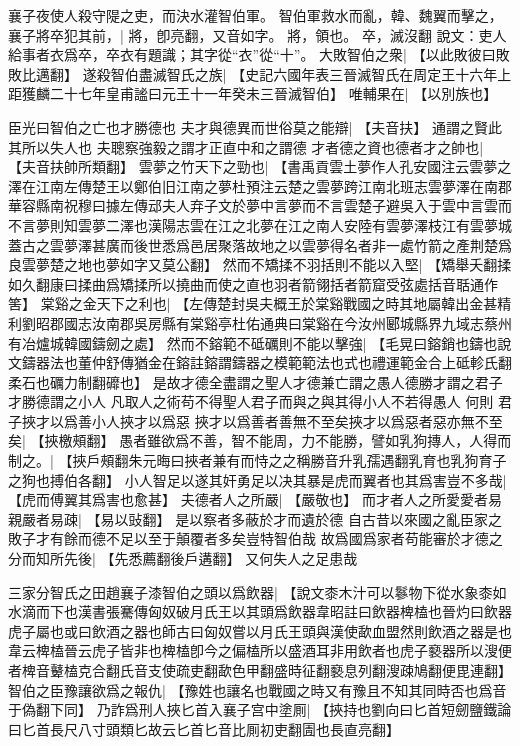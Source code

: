 襄子夜使人殺守隄之吏，而決水灌智伯軍。
智伯軍救水而亂，韓、魏翼而擊之，襄子將卒犯其前，|{
	將，卽亮翻，又音如字。
	將，領也。
	卒，滅沒翻
	說文：吏人給事者衣爲卒，卒衣有題識；其字從“衣”從“十”。
	}
大敗智伯之衆|{
	【以此敗彼曰敗敗比邁翻】
	}
遂殺智伯盡滅智氏之族|{
	【史記六國年表三晉滅智氏在周定王十六年上距獲麟二十七年皇甫謐曰元王十一年癸未三晉滅智伯】
	}
唯輔果在|{
	【以別族也】
	}
\par
臣光曰智伯之亡也才勝德也
夫才與德異而世俗莫之能辯|{
	【夫音扶】}
通謂之賢此其所以失人也
夫聰察強毅之謂才正直中和之謂德
才者德之資也德者才之帥也|{
	【夫音扶帥所類翻】}
雲夢之竹天下之勁也|{
	【書禹貢雲土夢作人孔安國注云雲夢之澤在江南左傳楚王以鄭伯旧江南之夢杜預注云楚之雲夢跨江南北班志雲夢澤在南郡華容縣南祝穆曰據左傳䢵夫人弃子文於夢中言夢而不言雲楚子避吳入于雲中言雲而不言夢則知雲夢二澤也漢陽志雲在江之北夢在江之南人安陸有雲夢澤枝江有雲夢城蓋古之雲夢澤甚廣而後世悉爲邑居聚落故地之以雲夢得名者非一處竹箭之產荆楚爲良雲夢楚之地也夢如字又莫公翻】}
然而不矯揉不羽括則不能以入堅|{
	【矯舉夭翻揉如久翻康曰揉曲爲矯揉所以撓曲而使之直也羽者箭翎括者箭窟受弦處括音聒通作筈】}
棠谿之金天下之利也|{
	【左傳楚封吳夫概王於棠谿戰國之時其地屬韓出金甚精利劉昭郡國志汝南郡吳房縣有棠谿亭杜佑通典曰棠谿在今汝州郾城縣界九域志蔡州有冶爐城韓國鑄劒之處】}
然而不鎔範不砥礪則不能以擊強|{
	【毛晃曰鎔銷也鑄也說文鑄器法也董仲舒傳猶金在鎔註鎔謂鑄器之模範範法也式也禮運範金合上砥軫氏翻柔石也礪力制翻䃺也】}
是故才德全盡謂之聖人才德兼亡謂之愚人德勝才謂之君子才勝德謂之小人
凡取人之術苟不得聖人君子而與之與其得小人不若得愚人
何則
君子挾才以爲善小人挾才以爲惡
挾才以爲善者善無不至矣挾才以爲惡者惡亦無不至矣|{
	【挾檄頰翻】}
愚者雖欲爲不善，智不能周，力不能勝，譬如乳狗摶人，人得而制之。|{
	【挾戶頰翻朱元晦曰挾者兼有而恃之之稱勝音升乳孺遇翻乳育也乳狗育子之狗也搏伯各翻】}
小人智足以遂其奸勇足以决其暴是虎而翼者也其爲害豈不多哉|{
	【虎而傅翼其爲害也愈甚】}
夫德者人之所嚴|{
	【嚴敬也】}
而才者人之所愛愛者易親嚴者易疎|{
	【易以䜴翻】}
是以察者多蔽於才而遺於德
自古昔以來國之亂臣家之敗子才有餘而德不足以至于顛覆者多矣豈特智伯哉
故爲國爲家者苟能審於才德之分而知所先後|{
	【先悉薦翻後戶遘翻】}
又何失人之足患哉
\par
三家分智氏之田趙襄子漆智伯之頭以爲飲器|{
	【說文桼木汁可以鬖物下從水象桼如水滴而下也漢書張騫傳匈奴破月氏王以其頭爲飲器韋昭註曰飲器椑榼也晉灼曰飲器虎子屬也或曰飲酒之器也師古曰匈奴嘗以月氏王頭與漢使歃血盟然則飲酒之器是也韋云椑榼晉云虎子皆非也椑榼卽今之偏榼所以盛酒耳非用飲者也虎子褻器所以溲便者椑音鼙榼克合翻氏音支使疏吏翻歃色甲翻盛時征翻褻息列翻溲疎鳩翻便毘連翻】}
智伯之臣豫讓欲爲之報仇|{
	【豫姓也讓名也戰國之時又有豫且不知其同時否也爲音于偽翻下同】}
乃詐爲刑人挾匕首入襄子宫中塗厠|{
	【挾持也劉向曰匕首短劒鹽鐵論曰匕首長尺八寸頭類匕故云匕首匕音比厠初吏翻圊也長直亮翻】}
